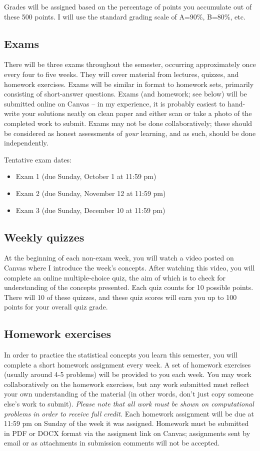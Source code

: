 \documentclass[10pt]{article}
\begin{document}
Grades will be assigned based on the percentage of points you accumulate out of these 500 points.  I will use the standard grading scale of A=90\%, B=80\%, etc.

\subsection*{Exams}
\label{sec:orgdac5763}
There will be three exams throughout the semester, occurring approximately once every four to five weeks.  They will cover material from lectures, quizzes, and homework exercises. Exams will be similar in format to homework sets, primarily consisting of short-answer questions. Exams (and homework; see below) will be submitted online on Canvas -- in my experience, it is probably easiest to hand-write your solutions neatly on clean paper and either scan or take a photo of the completed work to submit. Exams may not be done collaboratively; these should be considered as honest assessments of \emph{your} learning, and as such, should be done independently.

Tentative exam dates:

\begin{itemize}
\item Exam 1 (due Sunday, October 1 at 11:59 pm)
\item Exam 2 (due Sunday, November 12 at 11:59 pm)
\item Exam 3 (due Sunday, December 10 at 11:59 pm)
\end{itemize}

\subsection*{Weekly quizzes}
\label{sec:orgae26326}

At the beginning of each non-exam week, you will watch a video posted on Canvas where I introduce the week's concepts. After watching this video, you will complete an online multiple-choice quiz, the aim of which is to check for understanding of the concepts presented. Each quiz counts for 10 possible points. There will 10 of these quizzes, and these quiz scores will earn you up to 100 points for your overall quiz grade.

\subsection*{Homework exercises}
\label{sec:org95f23e8}
In order to practice the statistical concepts you learn this semester, you will complete a short homework assignment every week. A set of homework exercises (usually around 4-5 problems) will be provided to you each week. You may work collaboratively on the homework exercises, but any work submitted must reflect your own understanding of the material (in other words, don't just copy someone else's work to submit). \emph{Please note that all work must be shown on computational problems in order to receive full credit.} Each homework assignment will be due at 11:59 pm on Sunday of the week it was assigned. Homework must be submitted in PDF or DOCX format via the assigment link on Canvas; assignments sent by email or as attachments in submission comments will not be accepted.
\end{document}
